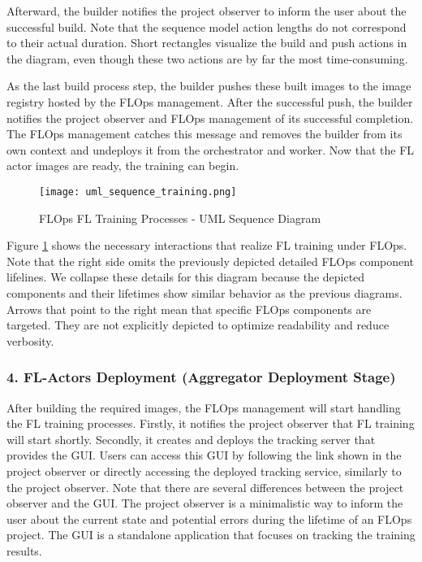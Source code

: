 Afterward, the builder notifies the project observer to inform the user about the successful build.
Note that the sequence model action lengths do not correspond to their actual duration.
Short rectangles visualize the build and push actions in the diagram, even though these two actions are by far the most time-consuming.

As the last build process step, the builder pushes these built images to the image registry hosted by the FLOps management.
After the successful push, the builder notifies the project observer and FLOps management of its successful completion.
The FLOps management catches this message and removes the builder from its own context and undeploys it from the orchestrator and worker.
Now that the FL actor images are ready, the training can begin.

\begin{figure}[p]
    \begin{adjustwidth}{-0.2\paperwidth}{-0.2\paperwidth}
        \centering
        \texttt{[image: uml\_sequence\_training.png]}
        \caption{FLOps FL Training Processes - UML Sequence Diagram}
        \label{fig:uml_sequence_training}
    \end{adjustwidth}
\end{figure}

Figure \ref{fig:uml_sequence_training} shows the necessary interactions that realize FL training under FLOps.
Note that the right side omits the previously depicted detailed FLOps component lifelines.
We collapse these details for this diagram because the depicted components and their lifetimes show similar behavior as the previous diagrams.
Arrows that point to the right mean that specific FLOps components are targeted.
They are not explicitly depicted to optimize readability and reduce verbosity.

\subsubsection{4. FL-Actors Deployment (Aggregator Deployment Stage)}
After building the required images, the FLOps management will start handling the FL training processes.
Firstly, it notifies the project observer that FL training will start shortly.
Secondly, it creates and deploys the tracking server that provides the GUI.
Users can access this GUI by following the link shown in the project observer or directly accessing the deployed tracking service, similarly to the project observer.
Note that there are several differences between the project observer and the GUI.
The project observer is a minimalistic way to inform the user about the current state and potential errors during the lifetime of an FLOps project.
The GUI is a standalone application that focuses on tracking the training results.

